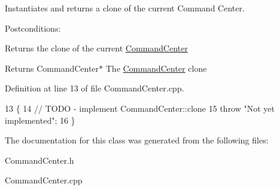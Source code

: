 Instantiates and returns a clone of the current Command Center. 

Postconditions\+:
\begin{DoxyItemize}
\item Returns the clone of the current \hyperlink{classCommandCenter}{Command\+Center}
\end{DoxyItemize}

\begin{DoxyReturn}{Returns}
Command\+Center$\ast$ The \hyperlink{classCommandCenter}{Command\+Center} clone 
\end{DoxyReturn}


Definition at line 13 of file Command\+Center.\+cpp.


\begin{DoxyCode}
13                                     \{
14     \textcolor{comment}{// TODO - implement CommandCenter::clone}
15     \textcolor{keywordflow}{throw} \textcolor{stringliteral}{"Not yet implemented"};
16 \}
\end{DoxyCode}


The documentation for this class was generated from the following files\+:\begin{DoxyCompactItemize}
\item 
Command\+Center.\+h\item 
Command\+Center.\+cpp\end{DoxyCompactItemize}
